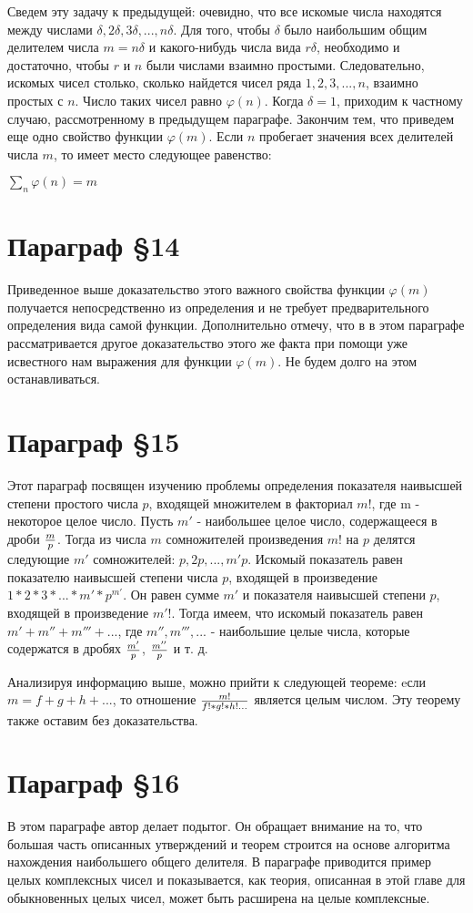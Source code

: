 Сведем эту задачу к предыдущей: очевидно, что все искомые числа находятся между числами $\delta,2\delta,3\delta,...,n\delta$. Для того, чтобы $\delta$ было наибольшим общим делителем числа $m = n\delta$ и какого-нибудь числа вида $r\delta$, необходимо и достаточно, чтобы $r$ и $n$ были числами взаимно простыми. Следовательно, искомых чисел столько, сколько найдется чисел ряда $1, 2, 3, . . . , n$, взаимно простых с $n$. Число таких чисел равно $\varphi(n)$. Когда $\delta = 1$, приходим к частному случаю, рассмотренному в предыдущем параграфе. Закончим тем, что приведем еще одно свойство функции $\varphi(m)$. Если $n$ пробегает значения всех делителей числа $m$, то имеет место следующее равенство:
\begin{center}
    $\sum_{n} \varphi(n) = m$
\end{center}

\section{Параграф \S 14}
Приведенное выше доказательство этого важного свойства функции $\varphi(m)$ получается непосредственно из определения и не требует предварительного определения вида самой функции. Дополнительно отмечу, что в в этом параграфе рассматривается другое доказательство этого же факта при помощи уже исвестного нам выражения для функции $\varphi(m)$. Не будем долго на этом останавливаться.

\section{Параграф \S 15}

Этот параграф посвящен изучению проблемы определения показателя наивысшей степени простого числа $p$, входящей множителем в факториал $m!$, где m - некоторое целое число. Пусть $m'$ - наибольшее целое число, содержащееся в дроби $m \over p$.  Тогда из числа $m$ сомножителей произведения $m!$ на $p$ делятся следующие $m'$ сомножителей: $p, 2p, ...,m'p$. Искомый показатель равен показателю наивысшей степени числа $p$, входящей в произведение $1*2*3*...*m'*p^{m'}$. Он равен сумме $m'$ и показателя наивысшей степени $p$, входящей в произведение $m′!$. Тогда имеем, что искомый показатель равен $m' + m'' + m'''+...$, где $m'', m''',...$ - наибольшие целые числа, которые содержатся в дробях $m' \over p$, $m'' \over p$ и т. д.

Анализируя информацию выше, можно прийти к следующей теореме: eсли $m = f + g + h + ...$, то отношение $m! \over f!*g!*h!...$ является целым числом. Эту теорему также оставим без доказательства.

\section{Параграф \S 16}

В этом параграфе автор делает подытог. Он обращает внимание на то, что большая часть описанных утверждений и теорем строится на основе алгоритма нахождения наибольшего общего делителя. В параграфе приводится пример целых комплексных чисел и показывается, как теория, описанная в этой главе для обыкновенных целых чисел, может быть расширена на целые комплексные. 